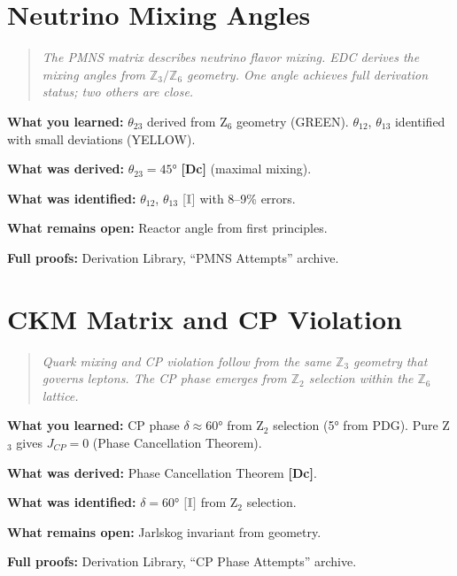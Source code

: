 \documentclass[11pt,a4paper]{book}
\theoremstyle{definition}
\theoremstyle{remark}
\newcommand{\tagDc}{\textcolor{calibratedColor}{\textbf{[Dc]}}}
\newcommand{\tagI}{\textcolor{gray}{\textbf{[I]}}}
\begin{document}
\chapter{Neutrino Mixing Angles}
\label{ch:pmns}
\label{ch:neutrinos_edge}%

\begin{quote}
\textit{The PMNS matrix describes neutrino flavor mixing. EDC derives the mixing
angles from $\mathbb{Z}_3 / \mathbb{Z}_6$ geometry. One angle achieves full derivation
status; two others are close.}
\end{quote}



\begin{chapterRecap}
\textbf{What you learned:} $\theta_{23}$ derived from Z$_6$ geometry (GREEN).
$\theta_{12}$, $\theta_{13}$ identified with small deviations (YELLOW).

\textbf{What was derived:} $\theta_{23} = 45°$ \tagDc{} (maximal mixing).

\textbf{What was identified:} $\theta_{12}$, $\theta_{13}$ \tagI{} with 8--9\% errors.

\textbf{What remains open:} Reactor angle from first principles.

\textbf{Full proofs:} Derivation Library, ``PMNS Attempts'' archive.
\end{chapterRecap}

\chapter{CKM Matrix and CP Violation}
\label{ch:ckm_cp}

\begin{quote}
\textit{Quark mixing and CP violation follow from the same $\mathbb{Z}_3$ geometry
that governs leptons. The CP phase emerges from $\mathbb{Z}_2$ selection within
the $\mathbb{Z}_6$ lattice.}
\end{quote}



\begin{chapterRecap}
\textbf{What you learned:} CP phase $\delta \approx 60°$ from Z$_2$ selection (5° from PDG).
Pure Z$_3$ gives $J_{CP} = 0$ (Phase Cancellation Theorem).

\textbf{What was derived:} Phase Cancellation Theorem \tagDc{}.

\textbf{What was identified:} $\delta = 60°$ \tagI{} from Z$_2$ selection.

\textbf{What remains open:} Jarlskog invariant from geometry.

\textbf{Full proofs:} Derivation Library, ``CP Phase Attempts'' archive.
\end{chapterRecap}
\end{document}
